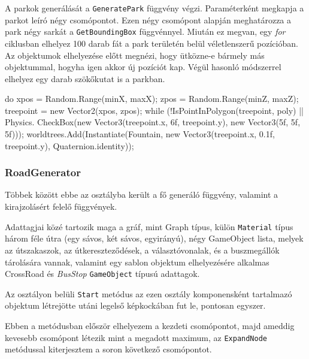A parkok generálását a \texttt{GeneratePark} függvény végzi. Paraméterként megkapja a parkot leíró négy csomópontot. Ezen négy csomópont alapján meghatározza a park négy sarkát a \texttt{GetBoundingBox} függvénnyel. Miután ez megvan, egy \textit{for} ciklusban elhelyez 100 darab fát a park területén belül véletlenszerű pozícióban. Az objektumok elhelyezése előtt megnézi, hogy ütközne-e bármely más objektummal, hogyha igen akkor új pozíciót kap. Végül hasonló módszerrel elhelyez egy darab szökőkutat is a parkban.
\begin{cpp}
do
        {
            xpos = Random.Range(minX, maxX);
            zpos = Random.Range(minZ, maxZ);
            treepoint = new Vector2(xpos, zpos);
        } while (!IsPointInPolygon(treepoint, poly) || Physics.
        CheckBox(new Vector3(treepoint.x, 6f, treepoint.y), 
        new Vector3(5f, 5f, 5f)));
        worldtrees.Add(Instantiate(Fountain, new Vector3(treepoint.x, 
        0.1f, treepoint.y), Quaternion.identity));
\end{cpp}

\subsubsection{RoadGenerator}

Többek között ebbe az osztályba került a fő generáló függvény, valamint a kirajzolásért felelő függvények.

Adattagjai közé tartozik maga a gráf, mint Graph típus, külön \texttt{Material} típus három féle útra (egy sávos, két sávos, egyirányú), négy GameObject lista, melyek az útszakaszok, az útkereszteződések, a választóvonalak, és a buszmegállók tárolására vannak, valamint egy sablon objektum elhelyezésére alkalmas CrossRoad és \textit{BusStop} \texttt{GameObject} típusú adattagok.

Az osztályon belüli \texttt{Start} metódus az ezen osztály komponensként tartalmazó objektum létrejötte utáni legelső képkockában fut le, pontosan egyszer.

Ebben a metódusban először elhelyezem a kezdeti csomópontot, majd ameddig kevesebb csomópont létezik mint a megadott maximum, az \texttt{ExpandNode} metódussal kiterjesztem a soron következő csomópontot.

